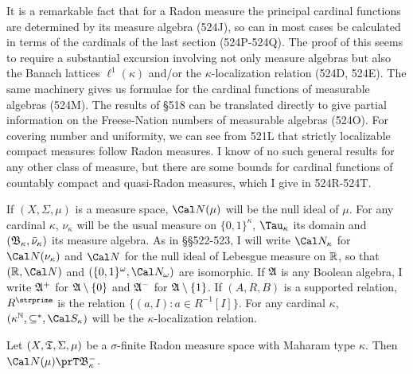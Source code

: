 
\def\chaptername{Cardinal functions of measure theory}
\def\sectionname{Radon measures}


It is a remarkable fact that for a Radon measure the principal cardinal
functions are determined by its measure algebra (524J), so can in most
cases be calculated in terms of the cardinals of
the last section (524P-524Q).   The proof of this seems to require a
substantial excursion involving not only measure algebras but also the
Banach lattices $\ell^1(\kappa)$ and/or the $\kappa$-localization
relation (524D, 524E).   The same machinery gives us formulae for the
cardinal functions of measurable algebras (524M).   The results of \S518
can be translated directly to give partial information on the
Freese-Nation numbers of measurable algebras (524O).   For covering
number and uniformity, we can see from 521L that strictly localizable
compact measures follow Radon measures.
I know of no such general results for any other class of measure, but
there are some bounds for cardinal functions of countably compact and
quasi-Radon measures, which I give in 524R-524T.  %

 If $(X,\Sigma,\mu)$ is a measure space,
$\Cal N(\mu)$ will be the null ideal of $\mu$.
For any cardinal $\kappa$, $\nu_{\kappa}$ will be the usual measure on
$\{0,1\}^{\kappa}$, $\Tau_{\kappa}$ its domain and
$(\frak B_{\kappa},\bar\nu_{\kappa})$ its measure algebra.   As in
\S\S522-523, I will
write $\Cal N_{\kappa}$ for $\Cal N(\nu_{\kappa})$ and $\Cal N$ for the
null ideal of Lebesgue measure on $\Bbb R$, so that
$(\Bbb R,\Cal N)$ and $(\{0,1\}^{\omega},\Cal N_{\omega})$ are
isomorphic.
If $\frak A$ is any Boolean algebra, I write $\frak A^+$ for
$\frak A\setminus\{0\}$ and $\frak A^-$ for $\frak A\setminus\{1\}$.
If $(A,R,B)$ is a supported relation, $R^{\strprime}$ is the
relation $\{(a,I):a\in R^{-1}[I]\}$.
For any cardinal $\kappa$, $(\kappa^{\Bbb N},\subseteq^*,\Cal S_{\kappa})$
will be the $\kappa$-localization relation.

 Let $(X,\frak T,\Sigma,\mu)$ be a
$\sigma$-finite
Radon measure space with Maharam type $\kappa$.   Then
$\Cal N(\mu)\prT\frak B_{\kappa}^-$.

